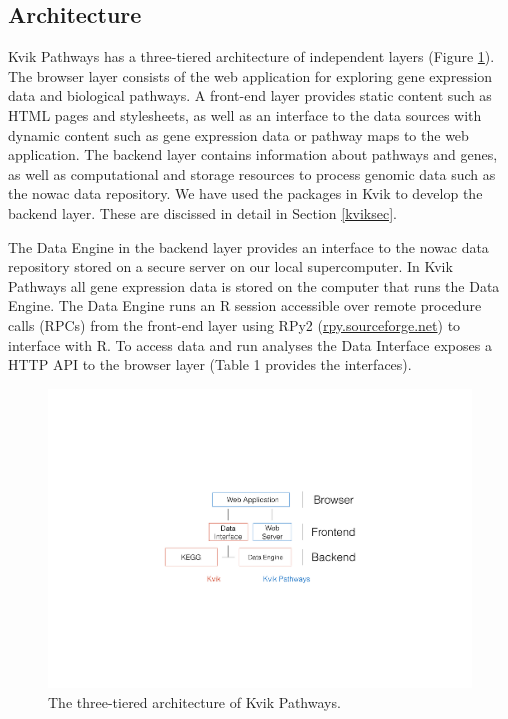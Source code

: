 \subsection{Architecture} 
Kvik Pathways has a three-tiered architecture of independent layers (Figure
\ref{fig:arch}). The browser layer consists of the web application for
exploring gene expression data and biological pathways. A front-end layer
provides static content such as HTML pages and stylesheets, as well as an
interface to the data sources with dynamic content such as gene expression
data or pathway maps to the web application. The backend layer contains
information about pathways and genes, as well as computational and storage
resources to process genomic data such as the \gls{nowac}  data repository. We
have used the packages in Kvik to develop the backend layer. These are discissed
in detail in Section \ref{kviksec}. 

The Data Engine in the backend layer provides an interface to the \gls{nowac} data
repository stored on a secure server on our local supercomputer. In Kvik
Pathways all gene expression data is stored on the computer that runs the Data
Engine. The Data Engine runs an R session accessible over remote procedure calls
(RPCs) from the front-end layer using RPy2
(\href{rpy.sourceforge.net}{rpy.sourceforge.net}) to interface with R. To access
data and run analyses the Data Interface exposes a HTTP API to the browser layer
(Table 1 provides the interfaces).

\begin{figure}[htb]
    \begin{centering}
    \includegraphics[width=\textwidth]{figures/archv2-name-fix.pdf}
    \caption{The three-tiered architecture of Kvik Pathways.} 
    \label{fig:arch}
    \end{centering} 
\end{figure}   

